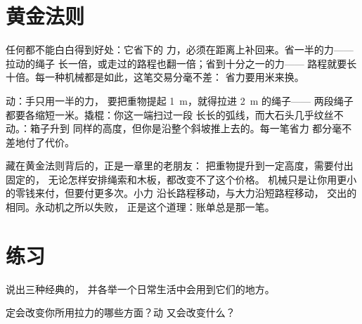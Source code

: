 \section{黄金法则}

\begin{proposition}[机械的黄金法则]\label{prop:g5:simple-machines:golden}
任何都不能白白得到好处：它省下的
力，必须在距离上补回来。省一半的力——拉动的绳子
长一倍，或走过的路程也翻一倍；省到十分之一的力——
路程就要长十倍。每一种机械都是如此，这笔交易分毫不差：
省力要用米来换。
\end{proposition}

\begin{example}[检验法则]\label{ex:g5:simple-machines:check}
动：手只用一半的力，
要把重物提起 \qty{1}{m}，就得拉进 \qty{2}{m} 的绳子——
两段绳子都要各缩短一米。撬棍：你这一端扫过一段
长长的弧线，而大石头几乎纹丝不动。：箱子升到
同样的高度，但你是沿整个斜坡推上去的。每一笔省力
都分毫不差地付了代价。
\end{example}

\begin{remark}[为什么不能钻这条法则的空子]\label{rem:g5:simple-machines:whygolden}
藏在黄金法则背后的，正是一章里的老朋友：
把重物提升到一定高度，需要付出固定的，
无论怎样安排绳索和木板，都改变不了这个价格。
机械只是让你用更小的零钱来付，但要付更多次。小力
沿长路程移动，与大力沿短路程移动，
交出的相同。永动机之所以失败，
正是这个道理：账单总是那一笔。
\end{remark}

\section{练习}

\begin{exercise}[$\star$]\label{exo:g5:simple-machines:1}
说出三种经典的，
并各举一个日常生活中会用到它们的地方。
\end{exercise}

\begin{exercise}[$\star$]\label{exo:g5:simple-machines:2}
定会改变你所用拉力的哪些方面？动
又会改变什么？
\end{exercise}

